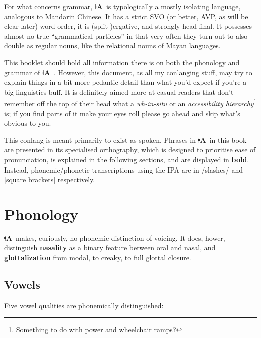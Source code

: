 \documentclass[11pt]{book}
\newcommand{\qcn}[1]{\textbf{#1}}
\newcommand{\langname}{\qcn{ǂA}~}
\begin{document}
For what concerns grammar, \langname is typologically a mostly isolating language, analogous to Mandarin Chinese. It has a strict SVO (or better, AVP, as will be clear later) word order, it is (split-)ergative, and strongly head-final. It possesses almost no true ``grammatical particles'' in that very often they turn out to also double as regular nouns, like the relational nouns of Mayan languages.

This booklet should hold all information there is on both the phonology and grammar of \langname. However, this document, as all my conlanging stuff, may try to explain things in a bit more pedantic detail than what you'd expect if you're a big linguistics buff. It is definitely aimed more at casual readers that don't remember off the top of their head what a \emph{wh-in-situ} or an \emph{accessibility hierarchy}\footnote{Something to do with power and wheelchair ramps?} is; if you find parts of it make your eyes roll please go ahead and skip what's obvious to you.

This conlang is meant primarily to exist as spoken. Phrases in \langname in this book are presented in its specialised orthography, which is designed to prioritise ease of pronunciation, is explained in the following sections, and are displayed in \qcn{bold}. Instead, phonemic/phonetic transcriptions using the IPA are in /slashes/ and [square brackets] respectively.


\tableofcontents

\chapter{Phonology}

\langname makes, curiously, no phonemic distinction of voicing. It does, hower, distinguish \textbf{nasality} as a binary feature between oral and nasal, and \textbf{glottalization} from modal, to creaky, to full glottal closure. 

\section{Vowels}

Five vowel qualities are phonemically distinguished:

\begin{center}
    \begin{vowel}
        \putcvowel{\qcn{i}}{1}
        \putcvowel{\qcn{e}}{2}
        \putcvowel{\qcn{a}}{4}
        \putcvowel{\qcn{o} /ɔ/}{6}
        \putcvowel{\qcn{u}}{8}
    \end{vowel}
\end{center}
\end{document}
